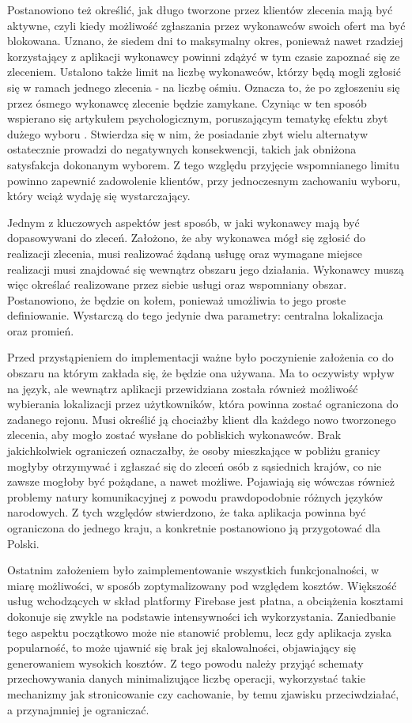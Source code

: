 Postanowiono też określić, jak długo tworzone przez klientów zlecenia mają być aktywne, czyli kiedy możliwość zgłaszania przez wykonawców swoich ofert ma być blokowana. Uznano, że siedem dni to maksymalny okres, ponieważ nawet rzadziej korzystający z aplikacji wykonawcy powinni zdążyć w tym czasie zapoznać się ze zleceniem. Ustalono także limit na liczbę wykonawców, którzy będą mogli zgłosić się w ramach jednego zlecenia - na liczbę ośmiu. Oznacza to, że po zgłoszeniu się przez ósmego wykonawcę zlecenie będzie zamykane. Czyniąc w ten sposób wspierano się artykułem psychologicznym, poruszającym tematykę efektu zbyt dużego wyboru \cite{choice-complexity}. Stwierdza się w nim, że posiadanie zbyt wielu alternatyw ostatecznie prowadzi do negatywnych konsekwencji, takich jak obniżona satysfakcja dokonanym wyborem. Z tego względu przyjęcie wspomnianego limitu powinno zapewnić zadowolenie klientów, przy jednoczesnym zachowaniu wyboru, który wciąż wydaję się wystarczający.

Jednym z kluczowych aspektów jest sposób, w jaki wykonawcy mają być dopasowywani do zleceń. Założono, że aby wykonawca mógł się zgłosić do realizacji zlecenia, musi realizować żądaną usługę oraz wymagane miejsce realizacji musi znajdować się wewnątrz obszaru jego działania. Wykonawcy muszą więc określać realizowane przez siebie usługi oraz wspomniany obszar. Postanowiono, że będzie on kołem, ponieważ umożliwia to jego proste definiowanie. Wystarczą do tego jedynie dwa parametry: centralna lokalizacja oraz promień.

Przed przystąpieniem do implementacji ważne było poczynienie założenia co do obszaru na którym zakłada się, że będzie ona używana. Ma to oczywisty wpływ na język, ale wewnątrz aplikacji przewidziana została również możliwość wybierania lokalizacji przez użytkowników, która powinna zostać ograniczona do zadanego rejonu. Musi określić ją chociażby klient dla każdego nowo tworzonego zlecenia, aby mogło zostać wysłane do pobliskich wykonawców. Brak jakichkolwiek ograniczeń oznaczałby, że osoby mieszkające w pobliżu granicy mogłyby otrzymywać i zgłaszać się do zleceń osób z sąsiednich krajów, co nie zawsze mogłoby być pożądane, a nawet możliwe. Pojawiają się wówczas również problemy natury komunikacyjnej z powodu prawdopodobnie różnych języków narodowych. Z tych względów stwierdzono, że taka aplikacja powinna być ograniczona do jednego kraju, a konkretnie postanowiono ją przygotować dla Polski.

\pagebreak

Ostatnim założeniem było zaimplementowanie wszystkich funkcjonalności, w miarę możliwości, w sposób zoptymalizowany pod względem kosztów. Większość usług wchodzących w skład platformy Firebase jest płatna, a obciążenia kosztami dokonuje się zwykle na podstawie intensywności ich wykorzystania. Zaniedbanie tego aspektu początkowo może nie stanowić problemu, lecz gdy aplikacja zyska popularność, to może ujawnić się brak jej skalowalności, objawiający się generowaniem wysokich kosztów. Z tego powodu należy przyjąć schematy przechowywania danych minimalizujące liczbę operacji, wykorzystać takie mechanizmy jak stronicowanie czy cachowanie, by temu zjawisku przeciwdziałać, a przynajmniej je ograniczać.
